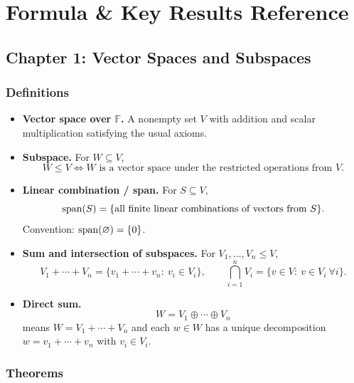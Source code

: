 \section{Formula \& Key Results Reference}

\subsection*{Chapter 1: Vector Spaces and Subspaces}

\subsubsection*{Definitions}

\begin{itemize}[leftmargin=*]
\item \textbf{Vector space over $\mathbb F$.} A nonempty set $V$ with addition and scalar multiplication satisfying the usual axioms.

\item \textbf{Subspace.} For $W\subseteq V$,
\[
W\le V \iff W\text{ is a vector space under the restricted operations from }V.
\]

\item \textbf{Linear combination / span.} For $S\subseteq V$,
\[
\operatorname{span}(S)=\{\text{all finite linear combinations of vectors from }S\}.
\]
Convention: $\operatorname{span}(\varnothing)=\{0\}$.

\item \textbf{Sum and intersection of subspaces.} For $V_1,\dots,V_n\le V$,
\[
V_1+\cdots+V_n=\{v_1+\cdots+v_n:\ v_i\in V_i\},
\qquad
\bigcap_{i=1}^n V_i=\{v\in V:\ v\in V_i\ \forall i\}.
\]

\item \textbf{Direct sum.} 
\[
W=V_1\oplus\cdots\oplus V_n
\]
means $W=V_1+\cdots+V_n$ and each $w\in W$ has a unique decomposition $w=v_1+\cdots+v_n$ with $v_i\in V_i$.
\end{itemize}

\subsubsection*{Theorems}


